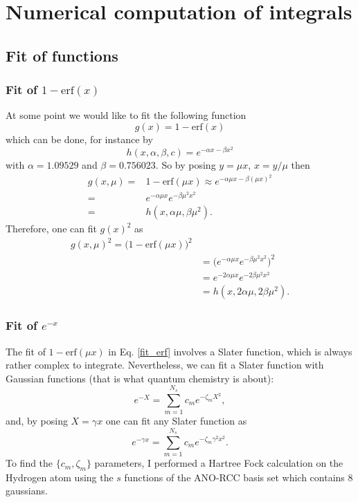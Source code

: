 \documentclass[aip,jcp,reprint,noshowkeys,superscriptaddress]{revtex4-1}
\begin{document}
\section{Numerical computation of integrals}
\subsection{Fit of functions}
\subsubsection{Fit of $1-\text{erf}(x)$}
At some point we would like to fit the following function
\begin{equation}
 g(x) = 1-\text{erf}(x)
\end{equation}
which can be done, for instance by 
\begin{equation}
 h(x,\alpha,\beta,c) = e^{-\alpha x - \beta x^2}
\end{equation}
with $\alpha=1.09529$ and $\beta = 0.756023$. 
So by posing $y=\mu x$, $x=y/\mu$ then
\begin{equation}
 \label{fit_erf}
 \begin{aligned}
  g(x,\mu)  =& 1 - \text{erf}(\mu x) \approx e^{-\alpha \mu x - \beta (\mu x)^2}\\ 
        =& e^{-\alpha \mu x } e^{-\beta \mu^2 x^2} \\
        =& h(x,\alpha \mu, \beta \mu^2).
 \end{aligned}
\end{equation}
Therefore, one can fit $g(x)^2$ as 
\begin{equation}
 \begin{aligned}
 g(x,\mu)^2 = \bigg( 1 - \text{erf}(\mu x) \bigg)^2\\
           &= \bigg( e^{-\alpha \mu x } e^{-\beta \mu^2 x^2}\bigg)^2 \\
           &= e^{-2\alpha  \mu x } e^{-2 \beta \mu^2 x^2} \\
           &= h(x,2 \alpha \mu, 2 \beta \mu^2).
 \end{aligned}
\end{equation}

\subsubsection{Fit of $e^{-x}$}
The fit of $1 - \text{erf}(\mu x)$ in Eq. \eqref{fit_erf} involves a Slater function, which is always rather complex to integrate. 
Nevertheless, we can fit a Slater function with Gaussian functions (that is what quantum chemistry is about):
\begin{equation}
 e^{-X} = \sum_{m=1}^{N_s} c_m e^{-\zeta_m X^2}, 
\end{equation}
and, by posing $X=\gamma x$ one can fit any Slater function as
\begin{equation}
 e^{-\gamma x} = \sum_{m=1}^{N_s} c_m e^{-\zeta_m \gamma^2 x^2}. 
\end{equation}
To find the $\{c_m,\zeta_m\}$ parameters, I performed a Hartree Fock calculation on the Hydrogen atom using the $s$ functions of the ANO-RCC basis set which contains 8 gaussians.  

                                                                                                                                                
\end{document}
